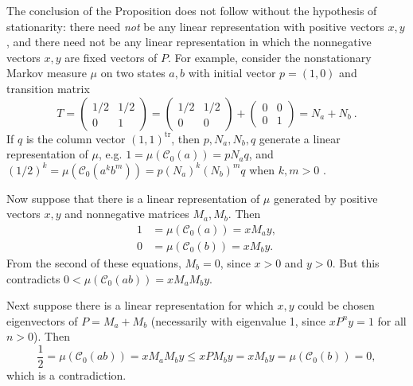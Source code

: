 \documentclass{kepart2010}
\theoremstyle{plain}
\theoremstyle{definition}
\theoremstyle{remark}
\theoremstyle{definition}
\numberwithin{equation}{section}
\begin{document}
\begin{ex}\label{nononinv}
The conclusion of the Proposition does not follow without the
hypothesis of stationarity: there need {\em not} be any linear
representation with positive vectors $x,y$, and there need not be
any linear representation in which the nonnegative vectors $x,y$ are
fixed vectors of $P$.
 For example, consider the nonstationary Markov measure $\mu$
on two states $a,b$ with initial vector $p=(1,0)$ and transition
matrix
 \begin{equation}
 T=
\left(
 \begin{array}{ccc}
    1/2 & 1/2\\
    0 &  1
     \end{array}  \right)
= \left(
 \begin{array}{ccc}
    1/2 & 1/2\\
    0 &  0
     \end{array}  \right)
+ \left(
 \begin{array}{ccc}
    0 & 0 \\
    0 &  1
     \end{array}  \right)
=N_a + N_b
 \ .    \end{equation}
If $q$ is the column vector $(1,1)^\text{tr}$, then $p,N_a,N_b,q$
generate a linear representation of $\mu$, e.g. $1=\mu({{\mathcal C}}_0(a)) =
pN_aq$, and
  $(1/2)^k=\mu({{\mathcal C}}_0(a^kb^m)) = p(N_a)^k(N_b)^mq$ when $k,m>0$ .

Now suppose that there is a linear representation of $\mu$
generated by positive vectors $x,y$ and nonnegative
matrices $M_a,M_b$. Then
 \begin{equation}
 \begin{aligned}
 1&=\mu({{\mathcal C}}_0(a))=xM_ay ,\\
 0&=\mu({{\mathcal C}}_0(b))=xM_by .
 \end{aligned}
 \end{equation}
 From the second of these equations, $M_b=0$, since $x>0$ and $y>0$.
 But this contradicts
$
 0 < \mu({{\mathcal C}}_0(ab)) = xM_aM_by
$.

Next suppose there is a linear representation for which  $x,y$ could
be chosen eigenvectors of $P=M_a + M_b$ (necessarily with eigenvalue
1, since $xP^ny=1$ for all $n>0$). Then \begin{equation} \frac 12 =
\mu({{\mathcal C}}_0(ab))= xM_aM_by \leq xPM_by = xM_by = \mu({{\mathcal C}}_0(b))=0 ,\end{equation}
which is a contradiction.

\end{ex}
\end{document}
